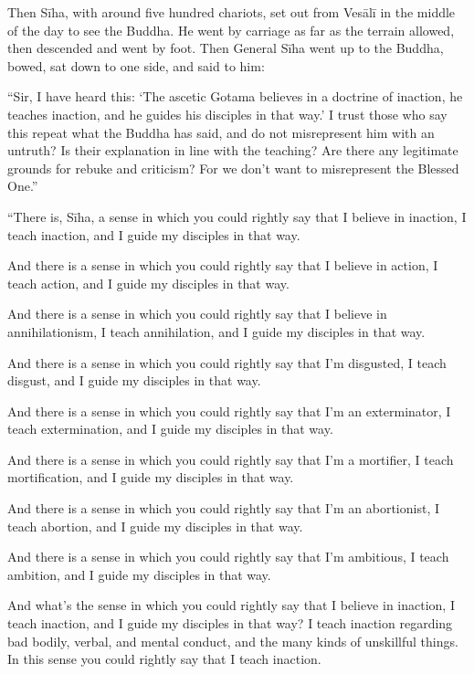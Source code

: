 \documentclass[12pt,openany]{book}%
\begin{document}
Then \textsanskrit{Sīha}, with around five hundred chariots, set out from \textsanskrit{Vesālī} in the middle of the day to see the Buddha. He went by carriage as far as the terrain allowed, then descended and went by foot. Then General \textsanskrit{Sīha} went up to the Buddha, bowed, sat down to one side, and said to him: 

“Sir, I have heard this: ‘The ascetic Gotama believes in a doctrine of inaction, he teaches inaction, and he guides his disciples in that way.’ I trust those who say this repeat what the Buddha has said, and do not misrepresent him with an untruth? Is their explanation in line with the teaching? Are there any legitimate grounds for rebuke and criticism? For we don’t want to misrepresent the Blessed One.” 

“There is, \textsanskrit{Sīha}, a sense in which you could rightly say that I believe in inaction, I teach inaction, and I guide my disciples in that way. 

And there is a sense in which you could rightly say that I believe in action, I teach action, and I guide my disciples in that way. 

And there is a sense in which you could rightly say that I believe in annihilationism, I teach annihilation, and I guide my disciples in that way. 

And there is a sense in which you could rightly say that I’m disgusted, I teach disgust, and I guide my disciples in that way. 

And there is a sense in which you could rightly say that I'm an exterminator, I teach extermination, and I guide my disciples in that way. 

And there is a sense in which you could rightly say that I’m a mortifier, I teach mortification, and I guide my disciples in that way. 

And there is a sense in which you could rightly say that I’m an abortionist, I teach abortion, and I guide my disciples in that way. 

And there is a sense in which you could rightly say that I’m ambitious, I teach ambition, and I guide my disciples in that way. 

And what’s the sense in which you could rightly say that I believe in inaction, I teach inaction, and I guide my disciples in that way? I teach inaction regarding bad bodily, verbal, and mental conduct, and the many kinds of unskillful things. In this sense you could rightly say that I teach inaction. 
\end{document}
